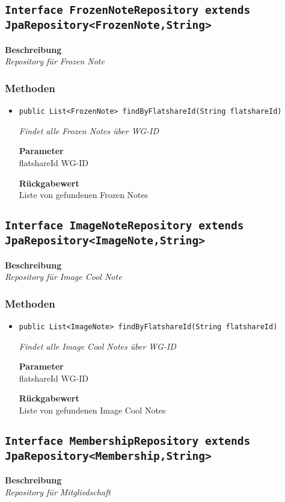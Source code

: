     \subsection{\texttt{Interface FrozenNoteRepository extends JpaRepository<FrozenNote,String>}}
    \textbf{Beschreibung} \\
    \textit{Repository für Frozen Note}
    \subsubsection*{Methoden}
    \begin{itemize}
    	\item{\texttt{public List<FrozenNote> findByFlatshareId(String flatshareId)}}
    	
    	\textit{Findet alle Frozen Notes über WG-ID}
    	
    	\textbf{Parameter} \\
    	flatshareId WG-ID
    	
    	\textbf{Rückgabewert} \\
    	Liste von gefundenen Frozen Notes
    \end{itemize}
    \subsection{\texttt{Interface ImageNoteRepository extends JpaRepository<ImageNote,String>}}
    \textbf{Beschreibung} \\
    \textit{Repository für Image Cool Note}
    \subsubsection*{Methoden}
    \begin{itemize}
    	\item{\texttt{public List<ImageNote> findByFlatshareId(String flatshareId)}}
    	
    	\textit{Findet alle Image Cool Notes über WG-ID}
    	
    	\textbf{Parameter} \\
    	flatshareId WG-ID
    	
    	\textbf{Rückgabewert} \\
    	Liste von gefundenen Image Cool Notes
    \end{itemize}
    \subsection{\texttt{Interface MembershipRepository extends JpaRepository<Membership,String>}}
    \textbf{Beschreibung} \\
    \textit{Repository für Mitgliedschaft}
